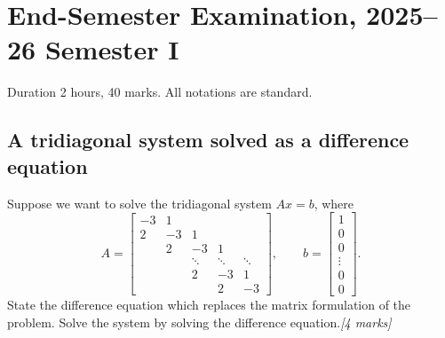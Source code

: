 \documentclass[11pt,a4paper]{article}
\newcommand{\mk}[1]{\hfill\textit{[#1 marks]}}
\begin{document}
\clearpage
\section{End-Semester Examination, 2025--26 Semester I}

Duration 2 hours, 40 marks.  All notations are standard.

\subsection{A tridiagonal system solved as a difference equation}

\begin{qbox}
Suppose we want to solve the tridiagonal system \(Ax=b\), where
\[
  A=\begin{bmatrix}
    -3&1&&&\\
    2&-3&1&&\\
    &2&-3&1&\\
    &&\ddots&\ddots&\ddots\\
    &&2&-3&1\\
    &&&2&-3
  \end{bmatrix},
  \qquad
  b=\begin{bmatrix}1\\0\\0\\\vdots\\0\\0\end{bmatrix}.
\]
State the difference equation which replaces the matrix formulation of
the problem.  Solve the system by solving the difference equation.\mk{4}
\end{qbox}
\end{document}

